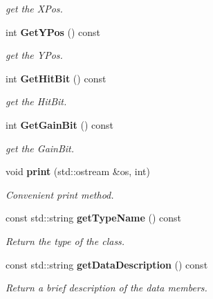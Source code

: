 \begin{DoxyCompactItemize}
\begin{DoxyCompactList}\small\item\em get the XPos. \item\end{DoxyCompactList}\item 
int {\bf GetYPos} () const \label{classCALICE_1_1LabviewBlock_a42495a34bc8c54fd5f26a8de2eb17584}

\begin{DoxyCompactList}\small\item\em get the YPos. \item\end{DoxyCompactList}\item 
int {\bf GetHitBit} () const \label{classCALICE_1_1LabviewBlock_abcf1f2fcce69be90c406ac96d2a960df}

\begin{DoxyCompactList}\small\item\em get the HitBit. \item\end{DoxyCompactList}\item 
int {\bf GetGainBit} () const \label{classCALICE_1_1LabviewBlock_adc2f3d040d21a1988569a6e4dd383f2e}

\begin{DoxyCompactList}\small\item\em get the GainBit. \item\end{DoxyCompactList}\item 
void {\bf print} (std::ostream \&os, int)\label{classCALICE_1_1LabviewBlock_ad1ac4cf349c76f815a0e0514aec496d6}

\begin{DoxyCompactList}\small\item\em Convenient print method. \item\end{DoxyCompactList}\item 
const std::string {\bf getTypeName} () const \label{classCALICE_1_1LabviewBlock_ad5cfc916c66f1211bcf189237473eba6}

\begin{DoxyCompactList}\small\item\em Return the type of the class. \item\end{DoxyCompactList}\item 
const std::string {\bf getDataDescription} () const \label{classCALICE_1_1LabviewBlock_a569668ec05207ba78574d45acce7e93a}

\begin{DoxyCompactList}\small\item\em Return a brief description of the data members. \item\end{DoxyCompactList}\end{DoxyCompactItemize}


